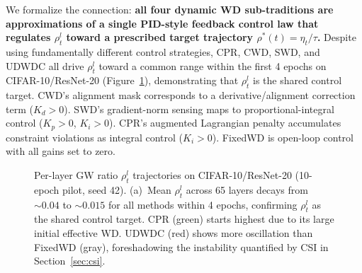 \documentclass{article}
\begin{document}
We formalize the connection: \textbf{all four dynamic WD sub-traditions are approximations of a single PID-style feedback control law that regulates $\rho_t^l$ toward a prescribed target trajectory $\rho^*(t) = \eta_t / \tau$.} Despite using fundamentally different control strategies, CPR, CWD, SWD, and UDWDC all drive $\rho_t^l$ toward a common range within the first 4 epochs on CIFAR-10/ResNet-20 (Figure~\ref{fig:rho_trajectories}), demonstrating that $\rho_t^l$ is the shared control target. CWD's alignment mask corresponds to a derivative/alignment correction term ($K_d > 0$). SWD's gradient-norm sensing maps to proportional-integral control ($K_p > 0$, $K_i > 0$). CPR's augmented Lagrangian penalty accumulates constraint violations as integral control ($K_i > 0$). FixedWD is open-loop control with all gains set to zero.

\begin{figure}[t]
\centering
{}
\caption{Per-layer GW ratio $\rho_t^l$ trajectories on CIFAR-10/ResNet-20 (10-epoch pilot, seed 42). (a)~Mean $\rho_t^l$ across 65 layers decays from ${\sim}0.04$ to ${\sim}0.015$ for all methods within 4 epochs, confirming $\rho_t^l$ as the shared control target. CPR (green) starts highest due to its large initial effective WD. UDWDC (red) shows more oscillation than FixedWD (gray), foreshadowing the instability quantified by CSI in Section~\ref{sec:csi}.}
\label{fig:rho_trajectories}
\end{figure}
\end{document}

